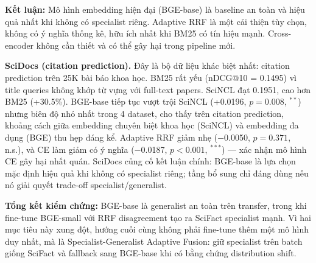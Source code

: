 \textbf{Kết luận:} Mô hình embedding hiện đại (BGE-base) là baseline an toàn và hiệu quả nhất khi
không có specialist riêng. Adaptive RRF là một cải thiện tùy chọn, không có ý nghĩa thống kê, hữu ích
nhất khi BM25 có tín hiệu mạnh. Cross-encoder không cần thiết và có thể gây hại trong pipeline mới.

\textbf{SciDocs (citation prediction).} Đây là bộ dữ liệu khác biệt nhất: citation prediction trên
25K bài báo khoa học. BM25 rất yếu (nDCG@10 = 0.1495) vì title queries không khớp từ vựng với full-text
papers. SciNCL đạt 0.1951, cao hơn BM25 (+30.5\%). BGE-base tiếp tục vượt trội SciNCL (+0.0196,
$p=0.008$, ${}^{**}$) nhưng biên độ nhỏ nhất trong 4 dataset, cho thấy trên citation prediction,
khoảng cách giữa embedding chuyên biệt khoa học (SciNCL) và embedding đa dụng (BGE) thu hẹp đáng kể.
Adaptive RRF giảm nhẹ ($-$0.0050, $p=0.371$, n.s.), và CE làm giảm có ý nghĩa
($-$0.0187, $p<0.001$, ${}^{***}$) --- xác nhận mô hình CE gây hại nhất quán. SciDocs củng cố
kết luận chính: BGE-base là lựa chọn mặc định hiệu quả khi không có specialist riêng; tầng bổ sung
chỉ đáng dùng nếu nó giải quyết trade-off specialist/generalist.

\textbf{Tổng kết kiểm chứng:} BGE-base là generalist an toàn trên transfer, trong khi fine-tune
BGE-small với RRF disagreement tạo ra SciFact specialist mạnh. Vì hai mục tiêu này xung đột, hướng
cuối cùng không phải fine-tune thêm một mô hình duy nhất, mà là Specialist-Generalist Adaptive Fusion:
giữ specialist trên batch giống SciFact và fallback sang BGE-base khi có bằng chứng distribution shift.
